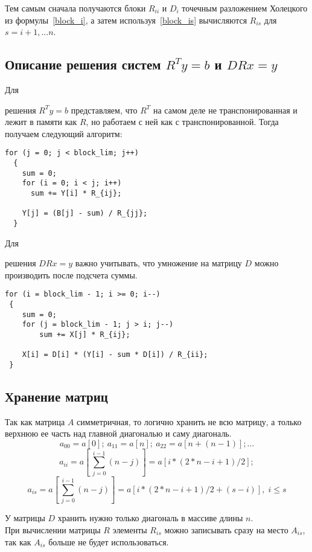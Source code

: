 \documentclass[a4paper,12pt]{article}
\begin{document}
    Тем самым сначала получаются блоки $R_{ii}$ и $D_i$ точечным разложением 
    Холецкого из формулы~\eqref{block_i}, а затем используя~\eqref{block_is} 
    вычисляются $R_{is}$ для $s = i+1,...n$.


\subsection{Описание решения систем $R^T y = b$ и $DRx = y$}
    \hypertarget{calc_y}{Для} 
    решения $R^T y = b$ представляем, что $R^T$ на самом деле не транспонированная
    и лежит в памяти как $R$, но работаем с ней как с транспонированной. 
    Тогда получаем следующий алгоритм:
    
\begin{verbatim}
for (j = 0; j < block_lim; j++) 
  {
    sum = 0;
    for (i = 0; i < j; i++)
      sum += Y[i] * R_{ij};
    
    Y[j] = (B[j] - sum) / R_{jj};
  }
\end{verbatim}

    \hypertarget{calc_x}{Для} 
    решения $DRx = y$ важно учитывать, что умножение на матрицу $D$ можно 
    производить после подсчета суммы.
    
\begin{verbatim}
for (i = block_lim - 1; i >= 0; i--)
 {
    sum = 0;
    for (j = block_lim - 1; j > i; j--)
        sum += X[j] * R_{ij};
    
    X[i] = D[i] * (Y[i] - sum * D[i]) / R_{ii};
 }
\end{verbatim}


\subsection{Хранение матриц}
    Так как матрица $A$ симметричная, то логично хранить не всю матрицу, 
    а только верхнюю ее часть над главной диагональю и саму диагональ. 
    $$ a_{00} = a [0]; \ a_{11} = a [n]; \ a_{22} = a [n + (n-1)]; ... $$
    $$ a_{ii} = a [\,\sum_{j=0}^{i-1}(n-j)] = a [i * (2 * n - i +1) / 2];  $$
    $$ 
        a_{is} = a [\,\sum_{j=0}^{i-1}(n-j)] = a [i * (2 * n - i +1) / 2 + (s - i)], 
        \; i \leq s  
    $$
    
    У матрицы $D$ хранить нужно только диагональ в массиве длины $n$.\\
    
    При вычислении матрицы $R$ элементы $R_{is}$ можно записывать сразу на место $A_{is}$,
    так как $A_{is}$ больше не будет использоваться. 
    
\end{document}
